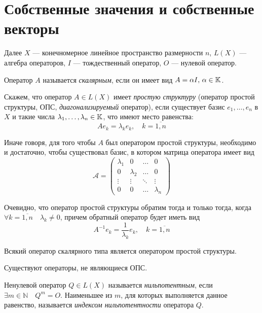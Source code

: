 \section{Собственные значения и собственные векторы}
Далее $X$ — конечномерное линейное пространство размерности $n$, $L(X)$ —
алгебра операторов, $I$ — тождественный оператор, $O$ — нулевой оператор.

\begin{definition}
    Оператор $A$ называется \emph{скалярным}, если он имеет вид $A = \alpha I, \,
    \alpha \in \mathbb{K}$.
\end{definition}

\begin{definition}\label{def:diagonalizable}
    Скажем, что оператор $A\in L(X)$ имеет \emph{простую структуру} (оператор простой структуры,
    ОПС, \emph{диагонализируемый} оператор), если существует базис $e_1,
    \dotsc, e_n$ в $X$ и такие числа $\lambda_1, \dotsc, \lambda_n \in
    \mathbb{K}$, что имеют место равенства:
    \[ Ae_k = \lambda_k e_k, \quad k = \overline{1,n} \]
\end{definition}

Иначе говоря, для того чтобы $A$ был оператором простой структуры, необходимо и
достаточно, чтобы существовал базис, в котором матрица оператора имеет вид
\[ \mathcal{A} = \begin{pmatrix}
        \lambda_1 & 0 & \ldots & 0 \\
        0 & \lambda_2 & \ldots & 0 \\
        \vdots & \vdots & \ddots & \vdots \\
        0 & 0 & \ldots & \lambda_n
\end{pmatrix} \]

Очевидно, что оператор простой структуры обратим тогда и только тогда, когда $
\forall k = \overline{1,n} \quad \lambda_k \neq 0 $, причем обратный оператор будет
иметь вид
\[ A^{-1} e_k = \frac{1}{\lambda_k} e_k, \quad k = \overline{1,n} \]

Всякий оператор скалярного типа является оператором простой структуры.

Существуют операторы, не являющиеся ОПС.

\begin{definition}
    Ненулевой оператор $ Q \in L(X) $ называется \emph{нильпотентным}, если
    $\exists m \in \mathbb{N} \quad Q^m = O$. Наименьшее из $m$, для которых
    выполняется данное равенство, называется \emph{индексом нильпотентности}
    оператора $Q$.
\end{definition}

